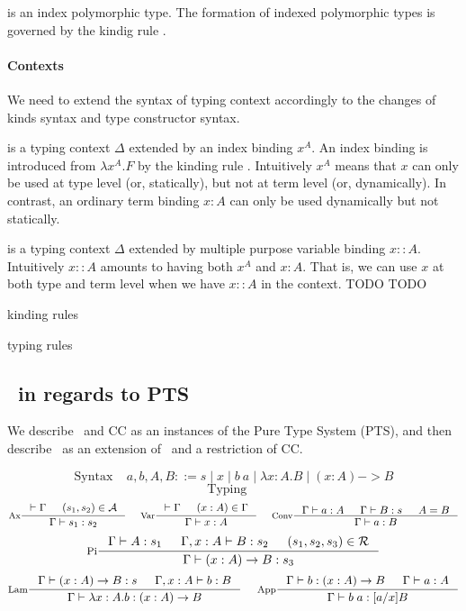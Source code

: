  is an index polymorphic type. The formation of
indexed polymorphic types is governed by the kindig rule .

\paragraph{Contexts}
We need to extend the syntax of typing context accordingly to the changes
of kinds syntax and type constructor syntax.

 is a typing context $\Delta$ extended by an index binding
$x^A$. An index binding is introduced from $\lambda x^A.F$ by the kinding rule
. Intuitively $x^A$ means that $x$ can only be used
at type level (or, statically), but not at term level (or, dynamically).
In contrast, an ordinary term binding $x:A$ can only be used dynamically
but not statically.

 is a typing context $\Delta$ extended by
multiple purpose variable binding $x::A$. Intuitively $x::A$ amounts to
having both $x^A$ and $x:A$. That is, we can use $x$ at both type and
term level when we have $x::A$ in the context.
TODO
TODO

kinding rules

typing rules
\newFi{(::)}









\subsection{\Fi\ in regards to PTS}
We describe \Fw\ and CC as an instances of the Pure Type System (PTS),
and then describe \Fi\ as an extension of \Fw\ and a restriction of CC.

\[\text{Syntax}~~~~~ a,b,A,B ::= s \mid x \mid b~a \mid \lambda x:A.B
                                   \mid (x:A) -> B \]
\[\text{Typing}~~~~~\]
\[
 \inference[Ax]{|-\Gamma & (s_1,s_2)\in\calA}{\Gamma |- s_1 : s_2}
 ~~~~
 \inference[Var]{|-\Gamma & (x:A)\in\Gamma}{\Gamma |- x:A} 
 ~~~~
 \inference[Conv]{\Gamma |- a:A & \Gamma |- B:s & A=B}{\Gamma |- a:B}
\]
\[
 \inference[Pi]{\Gamma |- A:s_1 & \Gamma,x:A |- B:s_2 & (s_1,s_2,s_3)\in\calR}
               {\Gamma |- (x:A)-> B : s_3}
\]
\[
 \inference[Lam]{\Gamma |- (x:A)-> B : s & \Gamma,x:A |- b:B}
                {\Gamma |- \lambda x:A.b : (x:A)-> B}
 ~~~~
 \inference[App]{\Gamma |- b:(x:A)-> B & \Gamma |- a:A}{\Gamma |- b\;a:[a/x]B}
\]

